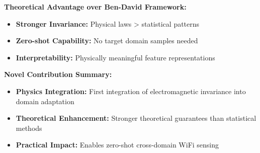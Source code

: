 \documentclass[12pt,a4paper]{article}
\begin{document}
\textbf{Theoretical Advantage over Ben-David Framework:}
\begin{itemize}
\item \textbf{Stronger Invariance:} Physical laws > statistical patterns
\item \textbf{Zero-shot Capability:} No target domain samples needed
\item \textbf{Interpretability:} Physically meaningful feature representations
\end{itemize}

\textbf{Novel Contribution Summary:}
\begin{itemize}
\item \textbf{Physics Integration:} First integration of electromagnetic invariance into domain adaptation
\item \textbf{Theoretical Enhancement:} Stronger theoretical guarantees than statistical methods
\item \textbf{Practical Impact:} Enables zero-shot cross-domain WiFi sensing
\end{itemize}



\end{document}
